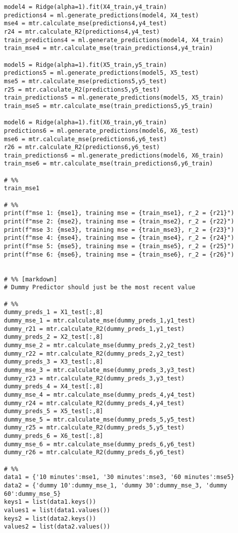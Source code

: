 \begin{verbatim}
model4 = Ridge(alpha=1).fit(X4_train,y4_train)
predictions4 = ml.generate_predictions(model4, X4_test)
mse4 = mtr.calculate_mse(predictions4,y4_test)
r24 = mtr.calculate_R2(predictions4,y4_test)
train_predictions4 = ml.generate_predictions(model4, X4_train)
train_mse4 = mtr.calculate_mse(train_predictions4,y4_train)

model5 = Ridge(alpha=1).fit(X5_train,y5_train)
predictions5 = ml.generate_predictions(model5, X5_test)
mse5 = mtr.calculate_mse(predictions5,y5_test)
r25 = mtr.calculate_R2(predictions5,y5_test)
train_predictions5 = ml.generate_predictions(model5, X5_train)
train_mse5 = mtr.calculate_mse(train_predictions5,y5_train)

model6 = Ridge(alpha=1).fit(X6_train,y6_train)
predictions6 = ml.generate_predictions(model6, X6_test)
mse6 = mtr.calculate_mse(predictions6,y6_test)
r26 = mtr.calculate_R2(predictions6,y6_test)
train_predictions6 = ml.generate_predictions(model6, X6_train)
train_mse6 = mtr.calculate_mse(train_predictions6,y6_train)

# %%
train_mse1

# %%
print(f"mse 1: {mse1}, training mse = {train_mse1}, r_2 = {r21}")
print(f"mse 2: {mse2}, training mse = {train_mse2}, r_2 = {r22}")
print(f"mse 3: {mse3}, training mse = {train_mse3}, r_2 = {r23}")
print(f"mse 4: {mse4}, training mse = {train_mse4}, r_2 = {r24}")
print(f"mse 5: {mse5}, training mse = {train_mse5}, r_2 = {r25}")
print(f"mse 6: {mse6}, training mse = {train_mse6}, r_2 = {r26}")


# %% [markdown]
# Dummy Predictor should just be the most recent value

# %%
dummy_preds_1 = X1_test[:,8]
dummy_mse_1 = mtr.calculate_mse(dummy_preds_1,y1_test)
dummy_r21 = mtr.calculate_R2(dummy_preds_1,y1_test)
dummy_preds_2 = X2_test[:,8]
dummy_mse_2 = mtr.calculate_mse(dummy_preds_2,y2_test)
dummy_r22 = mtr.calculate_R2(dummy_preds_2,y2_test)
dummy_preds_3 = X3_test[:,8]
dummy_mse_3 = mtr.calculate_mse(dummy_preds_3,y3_test)
dummy_r23 = mtr.calculate_R2(dummy_preds_3,y3_test)
dummy_preds_4 = X4_test[:,8]
dummy_mse_4 = mtr.calculate_mse(dummy_preds_4,y4_test)
dummy_r24 = mtr.calculate_R2(dummy_preds_4,y4_test)
dummy_preds_5 = X5_test[:,8]
dummy_mse_5 = mtr.calculate_mse(dummy_preds_5,y5_test)
dummy_r25 = mtr.calculate_R2(dummy_preds_5,y5_test)
dummy_preds_6 = X6_test[:,8]
dummy_mse_6 = mtr.calculate_mse(dummy_preds_6,y6_test)
dummy_r26 = mtr.calculate_R2(dummy_preds_6,y6_test)

# %%
data1 = {'10 minutes':mse1, '30 minutes':mse3, '60 minutes':mse5}
data2 = {'dummy 10':dummy_mse_1, 'dummy 30':dummy_mse_3, 'dummy 60':dummy_mse_5}
keys1 = list(data1.keys())
values1 = list(data1.values())
keys2 = list(data2.keys())
values2 = list(data2.values())
  

\end{verbatim}
